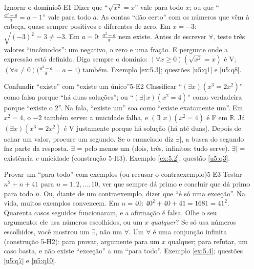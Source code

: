 \ErrosComuns

\begin{erro}{Ignorar o domínio}{5-E1}
 Dizer que \enquote{$\sqrt{x^2}=x$} vale para todo $x$; ou que \enquote{$\frac{a^2-a}{a}=a-1$} vale para todo $a$.
 As contas \enquote{dão certo} com os números que vêm à cabeça, quase sempre positivos e diferentes de zero.
 Em $x=-3$: $\sqrt{(-3)^2}=3\neq-3$. Em $a=0$: $\frac{a^2-a}{a}$ nem existe.
 Antes de escrever $\forall$, teste três valores \enquote{incômodos}: um negativo, o zero e uma fração. E pergunte onde a expressão está definida.
 Diga sempre o domínio: $(\forall x\ge0)(\sqrt{x^2}=x)$ é V; $(\forall a\neq0)\big(\frac{a^2-a}{a}=a-1\big)$ também.
 Exemplo \ref{ex:5.3}; questões \ref{u5:q1} e \ref{u5:q8}.
\end{erro}

\begin{erro}{Confundir \enquote{existe} com \enquote{existe um único}}{5-E2}
 Classificar \enquote{$(\exists x)(x^3=2x^2)$} como falsa porque \enquote{há duas soluções}; ou \enquote{$(\exists|\,x)(x^2=4)$} como verdadeira porque \enquote{existe o 2}.
 Na fala, \enquote{existe um} soa como \enquote{existe exatamente um}.
 Em $x^2=4$, o $-2$ também serve: a unicidade falha, e $(\exists|\,x)(x^2=4)$ é F em $\mathbb{R}$. Já $(\exists x)(x^3=2x^2)$ é V justamente porque há solução (há até duas).
 Depois de achar um valor, procure um segundo. Se o enunciado diz $\exists|$, a busca do segundo faz parte da resposta.
 $\exists$ = pelo menos um (dois, três, infinitos: tudo serve). $\exists|$ = existência \emph{e} unicidade (construção 5-H3).
 Exemplo \ref{ex:5.2}; questão \ref{u5:q3}.
\end{erro}

\begin{erro}{Provar um \enquote{para todo} com exemplos (ou recusar o contraexemplo)}{5-E3}
 Testar $n^2+n+41$ para $n=1,2,\ldots,10$, ver que sempre dá primo e concluir que dá primo para todo $n$. Ou, diante de um contraexemplo, dizer que \enquote{é só uma exceção}.
 Na vida, muitos exemplos convencem.
 Em $n=40$: $40^2+40+41=1681=41^2$. Quarenta casos seguidos funcionaram, e a afirmação é falsa.
 Olhe o seu argumento: ele usa números escolhidos, ou um $x$ \emph{qualquer}? Se só usa números escolhidos, você mostrou um $\exists$, não um $\forall$.
 Um $\forall$ é uma conjunção infinita (construção 5-H2): para provar, argumente para um $x$ qualquer; para refutar, um caso basta, e não existe \enquote{exceção} a um \enquote{para todo}.
 Exemplo \ref{ex:5.4}; questões \ref{u5:q7} e \ref{u5:q10}.
\end{erro}

